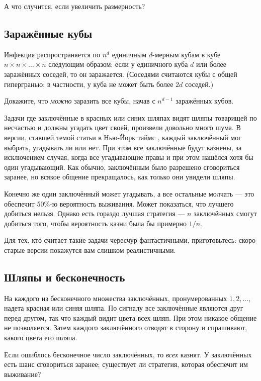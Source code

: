 А что случится, если увеличить размерность?

\subsection*{Заражённые кубы}

Инфекция распространяется по $n^d$ единичным $d$-мерным кубам в кубе $n \times n \times \dots \times n$ следующим образом: если у единичного куба $d$ или более заражённых соседей, то он заражается.
(Соседями считаются кубы с общей гипергранью; в частности, у куба не может быть более $2d$ соседей.)

Докажите, что \emph{можно} заразить все кубы, начав с $n^{d-1}$ заражённых кубов.

\medskip

Задачи где заключённые в красных или синих шляпах видят шляпы товарищей по несчастью и должны угадать цвет своей, произвели довольно много шума.
В версии, ставшей темой статьи в Нью-Йорк таймс \cite{50}, каждый заключённый мог выбрать, угадывать ли или нет.
При этом все заключённые будут казнены, за исключением случая, когда все угадывающие правы и при этом нашёлся хотя бы один угадывающий.
Как обычно, заключённым было разрешено сговориться заранее, но всякое общение прекращалось, как только они увидели шляпы.

Конечно же один заключённый может угадывать, а все остальные молчать --- 
это обеспечит 50\%-ю вероятность выживания. 
Может показаться, что лучшего добиться нельзя.
Однако есть гораздо лучшая стратегия --- $n$ заключённых смогут добиться того, чтобы вероятность казни была бы примерно $1/n$.

Для тех, кто считает такие задачи чересчур фантастичными, приготовьтесь:
скоро старые версии покажутся вам слишком реалистичными.

\subsection*{Шляпы и бесконечность}\label{Шляпы и бесконечность}

На каждого из бесконечного множества заключённых, пронумерованных $1,2,\dots$, надета красная или синяя шляпа.
По сигналу все заключённые являются друг перед другом, так что каждый видит цвета всех шляп.
При этом никакое общение не позволяется.
Затем каждого заключённого отводят в сторону и спрашивают, какого цвета его шляпа.

Если ошиблось бесконечное число заключённых, то \emph{всех} казнят. 
У заключённых есть шанс сговориться заранее;
существует ли стратегия, которая обеспечит им выживание?

